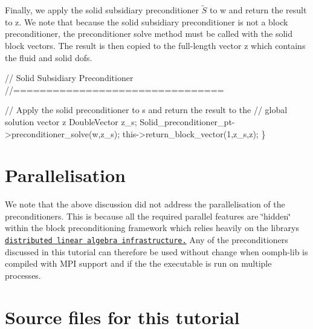 Finally, we apply the solid subsidiary preconditioner $\tilde S$ to {\ttfamily w} and return the result to {\ttfamily z}. We note that because the solid subsidiary preconditioner is not a block preconditioner, the preconditioner solve method must be called with the solid block vectors. The result is then copied to the full-\/length vector {\ttfamily z} which contains the fluid and solid dofs.

 
\begin{DoxyCodeInclude}
 \textcolor{comment}{// Solid Subsidiary Preconditioner}
 \textcolor{comment}{//================================}

 \textcolor{comment}{// Apply the solid preconditioner to s and return the result to the }
 \textcolor{comment}{// global solution vector z}
 DoubleVector z\_s;
 Solid\_preconditioner\_pt->preconditioner\_solve(w,z\_s);
 this->return\_block\_vector(1,z\_s,z);
\}

\end{DoxyCodeInclude}




 

\hypertarget{index_para}{}\section{Parallelisation}\label{index_para}
We note that the above discussion did not address the parallelisation of the preconditioners. This is because all the required parallel features are \char`\"{}hidden\char`\"{} within the block preconditioning framework which relies heavily on the library\textquotesingle{}s \href{../../../mpi/distributed_linear_algebra_infrastructure/html/index.html}{\tt distributed linear algebra infrastructure.} Any of the preconditioners discussed in this tutorial can therefore be used without change when {\ttfamily oomph-\/lib} is compiled with M\+PI support and if the the executable is run on multiple processes.



 

\hypertarget{index_sources}{}\section{Source files for this tutorial}\label{index_sources}

